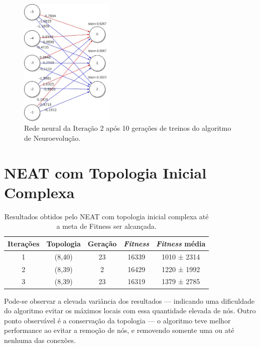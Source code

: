 \begin{figure}[htb]
        \centering
        \caption{\label{fig_nn5}Rede neural da Iteração 2 após 10 gerações de treinos do algoritmo de Neuroevolução.}
        \includegraphics[width=0.4\textwidth]{images/nn5.png}
\end{figure}

\section{NEAT com Topologia Inicial Complexa}

\begin{table}[htb]
	\centering
    \caption{\label{tabela_neatc}Resultados obtidos pelo NEAT com topologia inicial complexa até a meta de Fitness ser alcançada.}
    \begin{tabular}{ccccc}
        \hline
		\textbf{Itera{\c c}{\~o}es} & \textbf{Topologia} & \textbf{Gera{\c c}{\~a}o} & \textbf{\textit{Fitness}} & \textbf{\textit{Fitness} média} \\ \hline
		1 & (8,40)  & 23  & 16339  & 1010 ± 2314   \\ \hline
		2 & (8,39)  & 2   & 16429  & 1220 ± 1992   \\ \hline
		3 & (8,39)  & 23  & 16319  & 1379 ± 2785   \\ \hline
    \end{tabular}
\end{table}

Pode-se observar a elevada vari{\^a}ncia dos resultados — indicando uma
dificuldade do algoritmo evitar os m{\'a}ximos locais com essa quantidade
elevada de n{\'o}s. Outro ponto observável é a conservação da topologia — o algoritmo
teve melhor performance ao evitar a remo{\c c}{\~a}o de nós, e removendo
somente uma ou at{\'e} nenhuma das conex{\~o}es.

